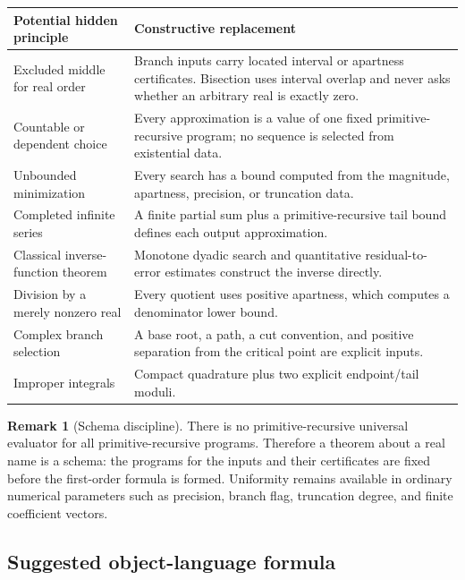 \documentclass[11pt]{article}
\theoremstyle{definition}
\newtheorem{remark}[theorem]{Remark}
\begin{document}
\begin{center}
\begin{tabularx}{\textwidth}{>{\raggedright\arraybackslash}p{} X}
\toprule
Potential hidden principle & Constructive replacement\\
\midrule
Excluded middle for real order & Branch inputs carry located interval or
apartness certificates.  Bisection uses interval overlap and never asks whether
an arbitrary real is exactly zero.\\
Countable or dependent choice & Every approximation is a value of one fixed
primitive-recursive program; no sequence is selected from existential data.\\
Unbounded minimization & Every search has a bound computed from the magnitude,
apartness, precision, or truncation data.\\
Completed infinite series & A finite partial sum plus a primitive-recursive
tail bound defines each output approximation.\\
Classical inverse-function theorem & Monotone dyadic search and quantitative
residual-to-error estimates construct the inverse directly.\\
Division by a merely nonzero real & Every quotient uses positive apartness,
which computes a denominator lower bound.\\
Complex branch selection & A base root, a path, a cut convention, and positive
separation from the critical point are explicit inputs.\\
Improper integrals & Compact quadrature plus two explicit endpoint/tail moduli.\\
\bottomrule
\end{tabularx}
\end{center}

\begin{remark}[Schema discipline]
There is no primitive-recursive universal evaluator for all primitive-recursive
programs.  Therefore a theorem about a real name is a schema: the programs for
the inputs and their certificates are fixed before the first-order formula is
formed.  Uniformity remains available in ordinary numerical parameters such as
precision, branch flag, truncation degree, and finite coefficient vectors.
\end{remark}

\subsection{Suggested object-language formula}
\end{document}
